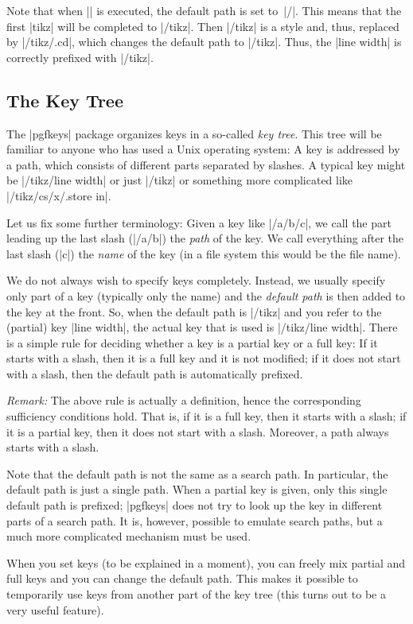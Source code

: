 Note that when |\pgfkeys| is executed, the default path is set to~|/|. This
means that the first |tikz| will be completed to |/tikz|. Then |/tikz| is a
style and, thus, replaced by |/tikz/.cd|, which changes the default path to
|/tikz|. Thus, the |line width| is correctly prefixed with |/tikz|.


\subsection{The Key Tree}

The |pgfkeys| package organizes keys in a so-called \emph{key tree}. This tree
will be familiar to anyone who has used a Unix operating system: A key is
addressed by a path, which consists of different parts separated by slashes. A
typical key might be |/tikz/line width| or just |/tikz| or something more
complicated like |/tikz/cs/x/.store in|.

Let us fix some further terminology: Given a key like |/a/b/c|, we call the
part leading up the last slash (|/a/b|) the \emph{path} of the key. We call
everything after the last slash (|c|) the \emph{name} of the key (in a file
system this would be the file name).

We do not always wish to specify keys completely. Instead, we usually specify
only part of a key (typically only the name) and the \emph{default path} is
then added to the key at the front. So, when the default path is |/tikz| and
you refer to the (partial) key |line width|, the actual key that is used is
|/tikz/line width|. There is a simple rule for deciding whether a key is a
partial key or a full key: If it starts with a slash, then it is a full key and
it is not modified; if it does not start with a slash, then the default path is
automatically prefixed.

\emph{Remark:} The above rule is actually a definition, hence the corresponding
sufficiency conditions hold. That is, if it is a full key, then it starts with
a slash; if it is a partial key, then it does not start with a slash. Moreover,
a path always starts with a slash.

Note that the default path is not the same as a search path. In particular, the
default path is just a single path. When a partial key is given, only this
single default path is prefixed; |pgfkeys| does not try to look up the key in
different parts of a search path. It is, however, possible to emulate search
paths, but a much more complicated mechanism must be used.

When you set keys (to be explained in a moment), you can freely mix partial and
full keys and you can change the default path. This makes it possible to
temporarily use keys from another part of the key tree (this turns out to be a
very useful feature).

